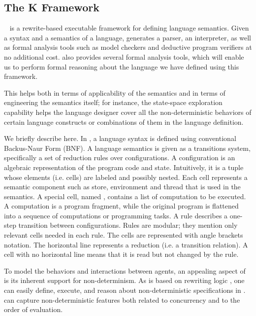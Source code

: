 \subsection{The \textbf{K} Framework}
\K~\cite{rosu-serbanuta-2013-k} is a rewrite-based executable framework for defining language semantics.
Given a syntax and a semantics of a language, \K generates a parser, an interpreter, as well as formal analysis tools such as model checkers and deductive program verifiers at no additional cost.
\K also provides several formal analysis tools, which will enable us to perform formal reasoning about the language we have defined using this framework. 

This helps both in terms of applicability of the semantics and in terms of engineering the semantics itself; for instance, the state-space exploration capability helps the language designer cover all the non-deterministic behaviors of certain language constructs or combinations of them in the language definition.

We briefly describe \K here. In \K, a language syntax is defined using conventional Backus-Naur Form (BNF).
A language semantics is given as a transitions system, specifically a set of reduction rules over configurations.
A configuration is an algebraic representation of the program code and state.
Intuitively, it is a tuple whose elements (i.e. cells) are labeled and possibly nested. 
Each cell represents a semantic component such as store, environment and thread that is used in the semantics.
A special cell, named , contains a list of computation to be executed.
A computation is a program fragment, while the original program is flattened into a sequence of computations or programming tasks.
A rule describes a one-step transition between configurations.
Rules are modular; they mention only relevant cells needed in each rule.
The cells are represented with angle brackets notation.
The horizontal line represents a reduction (i.e. a transition relation).
A cell with no horizontal line means that it is read but not changed by the rule.

To model the behaviors and interactions between agents, an appealing aspect of \K is its inherent support for non-determinism.
As \K is based on rewriting logic \cite{meseguer2007rewriting}, one can easily define, execute, and reason about non-deterministic specifications in \K. 
\K can capture non-deterministic features both related to concurrency and to the order of evaluation. 